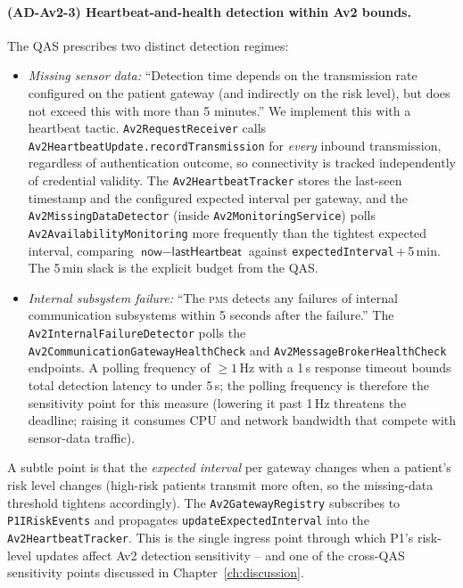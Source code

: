 \paragraph{(AD-Av2-3) Heartbeat-and-health detection within Av2 bounds.}
The QAS prescribes two distinct detection regimes:
\begin{itemize}
  \item \emph{Missing sensor data:} ``Detection time depends on the
        transmission rate configured on the patient gateway (and indirectly
        on the risk level), but does not exceed this with more than 5
        minutes.'' We implement this with a heartbeat tactic.
        \texttt{Av2RequestReceiver} calls
        \texttt{Av2HeartbeatUpdate.recordTransmission} for \emph{every}
        inbound transmission, regardless of authentication outcome, so
        connectivity is tracked independently of credential validity. The
        \texttt{Av2HeartbeatTracker} stores the last-seen timestamp and
        the configured expected interval per gateway, and the
        \texttt{Av2MissingDataDetector} (inside
        \texttt{Av2MonitoringService}) polls
        \texttt{Av2AvailabilityMonitoring} more frequently than the
        tightest expected interval, comparing
        $\textsf{now} - \textsf{lastHeartbeat}$ against
        \texttt{expectedInterval}\,+\,5\,min. The 5\,min slack is the
        explicit budget from the QAS.
  \item \emph{Internal subsystem failure:} ``The \textsc{pms} detects any
        failures of internal communication subsystems within 5 seconds
        after the failure.'' The \texttt{Av2InternalFailureDetector} polls
        the \texttt{Av2CommunicationGatewayHealthCheck} and
        \texttt{Av2MessageBrokerHealthCheck} endpoints. A polling
        frequency of $\geq 1$\,Hz with a 1\,s response timeout bounds
        total detection latency to under 5\,s; the polling frequency is
        therefore the sensitivity point for this measure (lowering it past
        1\,Hz threatens the deadline; raising it consumes CPU and network
        bandwidth that compete with sensor-data traffic).
\end{itemize}

A subtle point is that the \emph{expected interval} per gateway changes
when a patient's risk level changes (high-risk patients transmit more
often, so the missing-data threshold tightens accordingly). The
\texttt{Av2GatewayRegistry} subscribes to \texttt{P1IRiskEvents} and
propagates \texttt{updateExpectedInterval} into the
\texttt{Av2HeartbeatTracker}. This is the single ingress point through
which P1's risk-level updates affect Av2 detection sensitivity -- and one
of the cross-QAS sensitivity points discussed in
Chapter~\ref{ch:discussion}.

